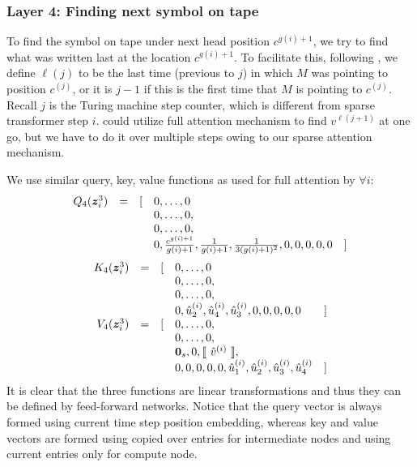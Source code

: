 \subsubsection{Layer 4: Finding next symbol on tape}
To find the symbol on tape under next head position $c^{g(i)+1}$, we try to find what was written last at the location $c^{g(i)+1}$.
To facilitate this, following \citep{Perez19}, we define $\ell(j)$ to be the last time (previous to $j$) in which $M$ was pointing to position $c^{(j)}$,
or it is $j-1$ if this is the first time that $M$ is pointing to $c^{(j)}$.
Recall $j$ is the Turing machine step counter, which is different from sparse transformer step $i$. \citep{Perez19} could utilize full attention mechanism to find $v^{\ell(j+1)}$ at one go, but we have to do it over multiple steps owing to our sparse attention mechanism.



We use similar query, key, value functions as used for full attention by \citep{Perez19} $\forall i $:
\begin{equation*}
\begin{array}{rcllr}
Q_4({\bm{z}}^3_i)  & = & [ 
& 0,\ldots,0 \\
&&& 0,\ldots,0, \\
&&& 0,\ldots,0, \\
&&& 0, \frac{c^{g(i)+1}}{g(i)+1}, \frac{1}{g(i)+1}, \frac{1}{3(g(i)+1)^2}, 0,0,0,0,0 & ] \\
\end{array}
\end{equation*}
\begin{equation*}
\begin{array}{rcllr}
K_4({\bm{z}}^3_i)  & = & [ 
& 0,\ldots,0 \\
&&& 0,\ldots,0, \\
&&& 0,\ldots,0, \\
&&& 0, \hat{u}_2^{(i)}, \hat{u}_4^{(i)}, \hat{u}_3^{(i)},0,0,0,0,0 & ] \\
V_4({\bm{z}}^3_i)  & = & [ 
& 0,\ldots,0, \\
&&& 0,\ldots,0, \\
&&& {\bm{0}}_s,0,\llbracket\ \hat{v}^{(i)}\ \rrbracket, \\
&&& 0,0,0,0,0, \hat{u}_1^{(i)}, \hat{u}_2^{(i)}, \hat{u}_3^{(i)} , \hat{u}_4^{(i)} & ] 
\end{array}
\end{equation*}
It is clear that the three functions are linear transformations and thus they can be defined by feed-forward networks. Notice that the query vector is always formed using current time step position embedding, whereas key and value vectors are formed using copied over entries for intermediate nodes and using current entries only for compute node.


